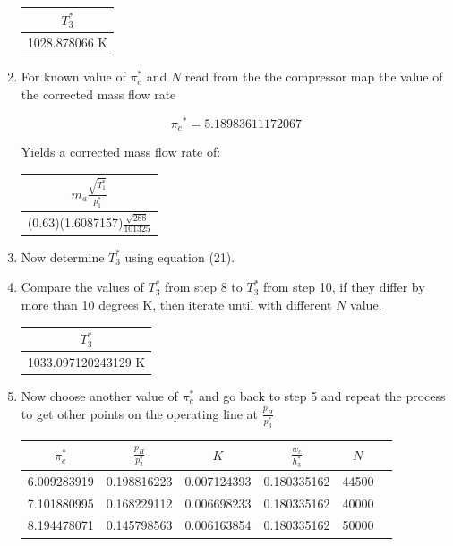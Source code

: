 \documentclass[titlepage]{article}
\begin{document}
\begin{enumerate}
    \begin{center}
      \begin{tabular}{|c|}
        \hline
        $T_{3}^{*}$ \\
        \hline
        1028.878066 K \\
        \hline
      \end{tabular}
    \end{center}
  
    \item For known value of $\pi_{c}^{*}$ and $N$ read from the the compressor map the value of the corrected mass flow rate
  
    \begin{equation}
      \pi{_c}^{*} = 5.18983611172067
    \end{equation}
  
    Yields a corrected mass flow rate of:
  
    \begin{center}
      \begin{tabular}{|c|}
        \hline
        $m_{a}\frac{\sqrt{T_{1}^{*}}}{p_{1}^{*}}$ \\
        \hline
        (0.63)(1.6087157)$\frac{\sqrt{288}}{101325}$ \\
        \hline
      \end{tabular}
    \end{center}
  
    \item Now determine $T_{3}^{*}$ using equation (21).
    \item Compare the values of $T_{3}^{*}$ from step 8 to $T_{3}^{*}$ from step 10, if they differ by more than 10 degrees K, then iterate until with different $N$ value.
    
    \begin{center}
      \begin{tabular}{|c|}
        \hline
        $T_{3}^{*}$ \\
        \hline
        1033.097120243129 K \\
        \hline
      \end{tabular}
    \end{center}
  
  \item Now choose another value of $\pi_{c}^{*}$ and go back to step 5 and repeat the process to get other points on the operating line at $\frac{p_{H}}{p_{3}^{*}}$ 
  
  \begin{center}
    \begin{tabular}{|c|c|c|c|c|c|}
      \hline
      $\pi_{c}^{*}$ & $\frac{p_{H}}{p_{3}^{*}}$ & $K$ & $\frac{w_{c}}{h_{3}^{*}}$ & $N$ \\
      \hline
      6.009283919	& 0.198816223	& 0.007124393 &	0.180335162	& 44500 \\
      \hline
      7.101880995	& 0.168229112 &	0.006698233 &	0.180335162	& 40000 \\
      \hline
      8.194478071 &	0.145798563 &	0.006163854	& 0.180335162	& 50000 \\
      \hline
    \end{tabular}
  \end{center}
  

\end{enumerate}
\end{document}
